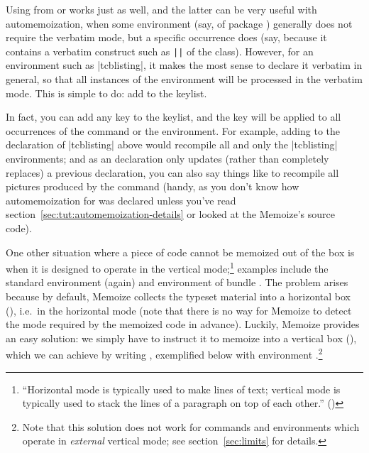 \documentclass[a4paper,11pt]{article}
\begin{document}
Using  from  or  works just as
well, and the latter can be very useful with automemoization, when some
environment (say,  of package ) generally does
not require the verbatim mode, but a specific occurrence does (say, because it
contains a verbatim construct such as \verb!|!\verb!|!  of
the  class).  However, for an environment such as |tcblisting|, it
makes the most sense to declare it verbatim in general, so that all instances
of the environment will be processed in the verbatim mode.  This is simple to
do: add  to the  keylist.


In fact, you can add any  key to the  keylist,
and the key will be applied to all occurrences of the command or the
environment.  For example, adding  to the declaration of
|tcblisting| above would recompile all and only the |tcblisting| environments;
and as an  declaration only updates (rather than completely
replaces) a previous declaration, you can also say things like
 to recompile all
\TikZ pictures produced by the  command (handy, as you don't know how
automemoization for  was declared unless you've read
section~\ref{sec:tut:automemoization-details} or looked at the Memoize's source
code).

One other situation where a piece of code cannot be memoized out of the box is
when it is designed to operate in the vertical mode;\footnote{``Horizontal mode
  is typically used to make lines of text; vertical mode is typically used to
  stack the lines of a paragraph on top of each other.'' (\TeXbyTopic[\S6])}
examples include the standard   environment
(again) and environment  of bundle .  The
problem arises because by default, Memoize collects the typeset material into a
horizontal box (), i.e.\ in the horizontal mode (note that there is no
way for Memoize to detect the mode required by the memoized code in advance).
Luckily, Memoize provides an easy solution: we simply have to instruct it to
memoize into a vertical box (), which we can achieve by writing
, exemplified below with
environment .\footnote{Note that this solution does not work
  for commands and environments which operate in \emph{external} vertical mode;
  see section~\ref{sec:limits} for details.}
\end{document}
